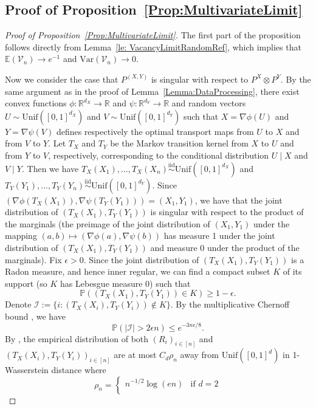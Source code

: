 \documentclass[11pt]{article}
\newcommand{\var}{\mathrm{Var}}
\newcommand{\iid}{\stackrel{\mathrm{iid}}\sim}
\begin{document}
\subsection{Proof of Proposition~\ref{Prop:MultivariateLimit}}
\begin{proof}[Proof of Proposition~\ref{Prop:MultivariateLimit}]
The first part of the proposition follows directly from Lemma~\ref{le: VacancyLimitRandomRef}, which implies that $\mathbb{E}(\mathcal{V}_n)\to e^{-1}$ and $\var(\mathcal{V}_n)\to 0$.

Now we consider the case that $P^{(X,Y)}$ is singular with respect to $P^X\otimes P^Y$. By the same argument as in the proof of Lemma~\ref{Lemma:DataProcessing}, there exist convex functions $\phi:\mathbb{R}^{d_X}\to\mathbb{R}$ and $\psi:\mathbb{R}^{d_Y}\to\mathbb{R}$ and random vectors $U\sim \mathrm{Unif}([0,1]^{d_X})$ and  $V\sim \mathrm{Unif}([0,1]^{d_Y})$ such that $X=\nabla \phi(U)$ and $Y=\nabla\psi(V)$ defines respectively the optimal transport maps from $U$ to $X$ and from $V$ to $Y$. Let $T_X$ and $T_Y$ be the Markov transition kernel from $X$ to $U$ and from $Y$ to $V$, respectively, corresponding to the conditional distribution $U\mid X$ and $V\mid Y$. Then we have $T_X(X_1),\ldots,T_X(X_n)\iid\mathrm{Unif}([0,1]^{d_X})$ and $T_Y(Y_1),\ldots,T_Y(Y_n)\iid\mathrm{Unif}([0,1]^{d_Y})$. Since $(\nabla \phi(T_X(X_1)), \nabla\psi(T_Y(Y_1))) = (X_1, Y_1)$, we have that the joint distribution of $(T_X(X_1),T_Y(Y_1))$ is singular with respect to the product of the marginals (the preimage of the joint distribution of $(X_1,Y_1)$ under the mapping $(a,b)\mapsto (\nabla\phi(a),\nabla\psi(b))$ has measure 1 under the joint distribution of $(T_X(X_1),T_Y(Y_1))$ and measure 0 under the product of the marginals). Fix $\epsilon > 0$. Since the joint distribution of $(T_X(X_1),T_Y(Y_1))$ is a Radon measure, and hence inner regular, we can find a compact subset $K$ of its support (so $K$ has Lebesgue measure 0) such that 
\[  
\mathbb{P}((T_X(X_1), T_Y(Y_1)) \in K) \geq 1 - \epsilon.
\]
Denote $\mathcal{I}:=\{i: (T_X(X_i), T_Y(Y_i)) \notin K\}$. By the multiplicative Chernoff bound \citep[Exercise~10.6.11]{samworth2025statistics}, we have 
\[  
\mathbb{P}(|\mathcal{I}| > 2\epsilon n) \leq e^{-3n\epsilon/8}.
\]
By \citet[Theorem~1]{fournier2015rate}, the empirical distribution of both $(R_i)_{i\in[n]}$ and  $(T_X(X_i), T_Y(Y_i))_{i\in[n]}$ are at most $C_d\rho_n$ away from $\mathrm{Unif}([0,1]^{d})$ in 1-Wasserstein distance where
\[  
\rho_n =\begin{cases}
    n^{-1/2}\log(en) & \text{if $d=2$}\\

\end{cases}\]
\end{proof}
\end{document}
